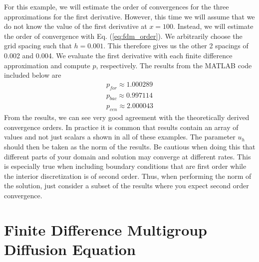 For this example, we will estimate the order of convergences for the three approximations for the first derivative. However,
this time we will assume that we do not know the value of the first derivative at $x=100$.  Instead, we will estimate the 
order of convergence with Eq. (\ref{eq:fdm_order}).  We arbitrarily choose the grid spacing such that $h=0.001$.
This therefore gives us the other 2 spacings of 0.002 and 0.004.  We evaluate the first derivative with each finite difference
approximation and compute $p$, respectively.  The results from the MATLAB code included below are
\begin{eqnarray}
     p_{for}  \approx 1.000289 \nonumber \\
     p_{bac} \approx 0.997114 \nonumber \\
     p_{cen} \approx 2.000043 \nonumber
\end{eqnarray}
From the results, we can see very good agreement with the theoretically derived convergence orders.  In practice
it is common that results contain an array of values and not just scalars a shown in all of these examples.  The parameter
$u_{h}$ should then be taken as the norm of the results.  Be cautious when doing this that different parts of your domain
and solution may converge at different rates.  This is especially true when including boundary conditions that are first
order while the interior discretization is of second order.  Thus, when performing the norm of the solution, just consider 
a subset of the results where you expect second order convergence.


\section{Finite Difference Multigroup Diffusion Equation}

